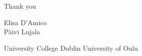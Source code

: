 \documentclass[aspectratio=169,11pt]{beamer}
\begin{document}
\begin{frame}[standout]
  \begin{center}
    {\Large Thank you}
    \vspace{1.6em}

    {\normalsize
     Elisa D'Amico \\[0.5em]
     P\"aivi Lujala }
    \vspace{1.2em}

    {\small University College Dublin \quad\textbullet\quad University of Oulu}
  \end{center}
\end{frame}
\end{document}
